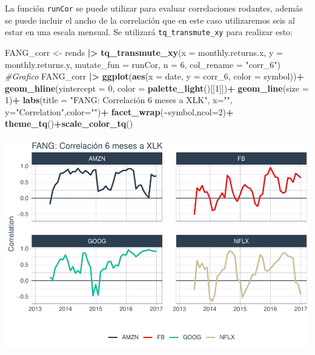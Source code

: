 \documentclass[
]{book}
\newenvironment{Shaded}{\begin{snugshade}}{\end{snugshade}}
\newcommand{\AttributeTok}[1]{\textcolor[rgb]{0.13,0.29,0.53}{#1}}
\newcommand{\CommentTok}[1]{\textcolor[rgb]{0.56,0.35,0.01}{\textit{#1}}}
\newcommand{\DecValTok}[1]{\textcolor[rgb]{0.00,0.00,0.81}{#1}}
\newcommand{\FunctionTok}[1]{\textcolor[rgb]{0.13,0.29,0.53}{\textbf{#1}}}
\newcommand{\NormalTok}[1]{#1}
\newcommand{\OtherTok}[1]{\textcolor[rgb]{0.56,0.35,0.01}{#1}}
\newcommand{\SpecialCharTok}[1]{\textcolor[rgb]{0.81,0.36,0.00}{\textbf{#1}}}
\newcommand{\StringTok}[1]{\textcolor[rgb]{0.31,0.60,0.02}{#1}}
\begin{document}
La función \texttt{runCor} se puede utilizar para evaluar correlaciones rodantes, además se puede incluir el ancho de la correlación que en este caso utilizaremos seis al estar en una escala mensual. Se utilizará \texttt{tq\_transmute\_xy} para realizar esto:

\begin{Shaded}
\begin{Highlighting}[]
\NormalTok{FANG\_corr }\OtherTok{\textless{}{-}}\NormalTok{ rends }\SpecialCharTok{|\textgreater{}} \FunctionTok{tq\_transmute\_xy}\NormalTok{(}\AttributeTok{x =}\NormalTok{ monthly.returns.x,}
                                   \AttributeTok{y =}\NormalTok{ monthly.returns.y,}
                                   \AttributeTok{mutate\_fun =}\NormalTok{ runCor,}
                                   \AttributeTok{n =} \DecValTok{6}\NormalTok{,}
                                   \AttributeTok{col\_rename =} \StringTok{"corr\_6"}\NormalTok{)}
\CommentTok{\#Grafico}
\NormalTok{FANG\_corr }\SpecialCharTok{|\textgreater{}} \FunctionTok{ggplot}\NormalTok{(}\FunctionTok{aes}\NormalTok{(}\AttributeTok{x =}\NormalTok{ date, }\AttributeTok{y =}\NormalTok{ corr\_6, }\AttributeTok{color =}\NormalTok{ symbol))}\SpecialCharTok{+}
             \FunctionTok{geom\_hline}\NormalTok{(}\AttributeTok{yintercept =} \DecValTok{0}\NormalTok{, }\AttributeTok{color =} \FunctionTok{palette\_light}\NormalTok{()[[}\DecValTok{1}\NormalTok{]])}\SpecialCharTok{+}
             \FunctionTok{geom\_line}\NormalTok{(}\AttributeTok{size =} \DecValTok{1}\NormalTok{)}\SpecialCharTok{+}
             \FunctionTok{labs}\NormalTok{(}\AttributeTok{title =} \StringTok{"FANG: Correlación 6 meses a XLK"}\NormalTok{, }\AttributeTok{x=}\StringTok{""}\NormalTok{, }\AttributeTok{y=}\StringTok{"Correlation"}\NormalTok{,}\AttributeTok{color=}\StringTok{""}\NormalTok{)}\SpecialCharTok{+}
             \FunctionTok{facet\_wrap}\NormalTok{(}\SpecialCharTok{\textasciitilde{}}\NormalTok{symbol,}\AttributeTok{ncol=}\DecValTok{2}\NormalTok{)}\SpecialCharTok{+}
             \FunctionTok{theme\_tq}\NormalTok{()}\SpecialCharTok{+}\FunctionTok{scale\_color\_tq}\NormalTok{()}
\end{Highlighting}
\end{Shaded}

\includegraphics{Libro_TidyQualityTools_files/figure-latex/unnamed-chunk-65-1.pdf}
\end{document}
